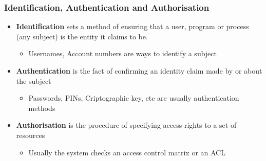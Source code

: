 \documentclass{beamer}
\begin{document}
\begin{frame}
\frametitle{Identification, Authentication and Authorisation}

\begin{itemize}
\item {\bf Identification} sets a method of ensuring that a user, program or process (any subject) is the entity it claims to be.
  \begin{itemize}
  \item Usernames, Account numbers are ways to identify a subject
  \end{itemize}
\item {\bf Authentication} is the fact of confirming an identity claim made by or about the subject
  \begin{itemize}
  \item Passwords, PINs, Criptographic key, etc are usually authentication methods
  \end{itemize}
\item {\bf Authorisation} is the procedure of specifying access rights to a set of resources
  \begin{itemize}
  \item Usually the system checks an access control matrix or an ACL
  \end{itemize}
\end{itemize}

\end{frame}
\end{document}

